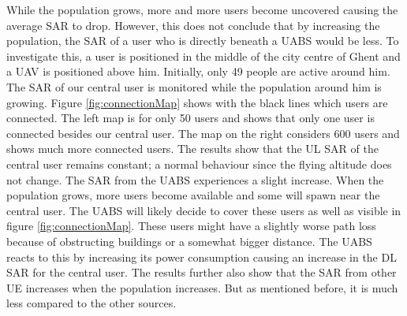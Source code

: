 \documentclass[twocolumn]{phdsymp} %
\begin{document}
While the population grows, more and more users become uncovered causing the average SAR to drop. 
However, this does not conclude that by increasing the population, the SAR of a user who is directly beneath a \gls{UABS} would be less.
To investigate this, a user is positioned in the middle of the city centre of Ghent and a \gls{UAV} is positioned above him. Initially, only 
49 people are active around him. The \gls{SAR} of our central user is monitored while the population around him is growing.
Figure \ref{fig:connectionMap} shows with the black lines which users are connected. The left map is for only 50 users and 
shows that only one user is connected besides our central user. The map on the right considers 600 users and shows much more connected users.
The results show that the \gls{UL} \gls{SAR} of the central user remains constant; a normal behaviour since the flying altitude does not change.
The \gls{SAR} from the \gls{UABS} experiences a slight increase. When the population grows, more users become available 
and some will spawn near the central user. The \gls{UABS} will likely decide to cover these users as well as visible in figure \ref{fig:connectionMap}.
These users might have a slightly 
worse path loss because of obstructing buildings or a somewhat bigger distance. The \gls{UABS} reacts to this by increasing 
its power consumption causing an increase in the \gls{DL} \gls{SAR} for the central user. The results further also show 
that the \gls{SAR} from other \gls{UE} increases when the population increases. But as mentioned  before, it is much less 
compared to the other sources.
\end{document}
